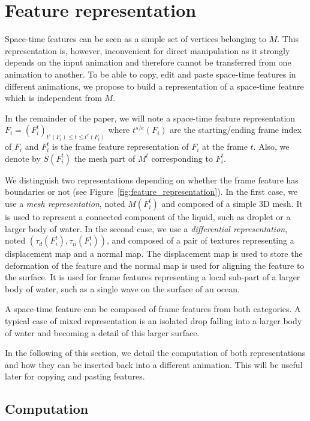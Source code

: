 \documentclass[review]{acmsiggraph}
\begin{document}
\section{Feature representation}
\label{sec:representation}

Space-time features can be seen as a simple set of vertices belonging to $M$.
This representation is, however, inconvenient for direct manipulation as it strongly depends on the input animation and therefore cannot be transferred from one animation to another. 
To be able to copy, edit and paste space-time features in different animations, we propose to build a representation of a space-time feature which is independent from $M$.

In the remainder 
of the paper, we will note a space-time feature representation $F_{i} = \left( F_{i}^{t} \right)_{t^{s}\left(F_{i}\right) \leq t \leq t^{e}\left(F_{i}\right)}$ where $t^{s/e}(F_{i})$ are the starting/ending frame index of $F_{i}$ and $F_{i}^{t}$ is the frame feature representation of $F_{i}$ at the frame $t$. 
Also, we denote by $S(F_{i}^{t})$ the mesh part of $M^{t}$ corresponding to $F_{i}^{t}$.

We distinguish two representations depending on whether the frame feature has boundaries or not (see Figure~\ref{fig:feature_representation}). 
In the first case, we use a \emph{mesh representation}, noted $M(F^t_i)$ and composed of a simple $3$D mesh. 
It is used to represent a connected component of the liquid, such as droplet or a larger body of water.
In the second case, we use a \emph{differential representation}, noted $(\tau_d(F^t_i), \tau_n(F^t_i))$, and composed of a pair of textures representing a displacement map and a normal map.
The displacement map is used to store the deformation of the feature and the normal map is used for aligning the feature to the surface.
It is used for frame features representing a local sub-part of a larger body of water, such as a single wave on the surface of an ocean.

A space-time feature can be composed of frame features from both categories.
A typical case of mixed representation is an isolated drop falling into a larger body of water and becoming a detail of this larger surface.

In the following of this section, we detail the computation of both representations and how they can be inserted back into a different animation. This will be useful later for copying and pasting features.

\subsection{Computation}
\label{sec:representation:computation}
\end{document}
